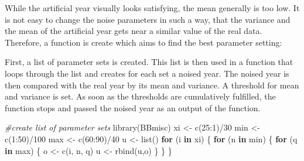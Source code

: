 \documentclass[
]{article}
\newenvironment{Shaded}{\begin{snugshade}}{\end{snugshade}}
\newcommand{\CommentTok}[1]{\textcolor[rgb]{0.56,0.35,0.01}{\textit{#1}}}
\newcommand{\ControlFlowTok}[1]{\textcolor[rgb]{0.13,0.29,0.53}{\textbf{#1}}}
\newcommand{\DecValTok}[1]{\textcolor[rgb]{0.00,0.00,0.81}{#1}}
\newcommand{\FunctionTok}[1]{\textcolor[rgb]{0.00,0.00,0.00}{#1}}
\newcommand{\NormalTok}[1]{#1}
\newcommand{\OtherTok}[1]{\textcolor[rgb]{0.56,0.35,0.01}{#1}}
\newcommand{\SpecialCharTok}[1]{\textcolor[rgb]{0.00,0.00,0.00}{#1}}
\begin{document}
While the artificial year visually looks satisfying, the mean generally
is too low. It is not easy to change the noise parameters in such a way,
that the variance and the mean of the artificial year gets near a
similar value of the real data. Therefore, a function is create which
aims to find the best parameter setting:

First, a list of parameter sets is created. This list is then used in a
function that loops through the list and creates for each set a noised
year. The noised year is then compared with the real year by its mean
and variance. A threshold for mean and variance is set. As soon as the
thresholds are cumulatively fulfilled, the function stops and passed the
noised year as an output of the function.

\begin{Shaded}
\begin{Highlighting}[]
\CommentTok{\#create list of parameter sets}
\FunctionTok{library}\NormalTok{(BBmisc)}
\NormalTok{xi }\OtherTok{\textless{}{-}} \FunctionTok{c}\NormalTok{(}\DecValTok{25}\SpecialCharTok{:}\DecValTok{1}\NormalTok{)}\SpecialCharTok{/}\DecValTok{30}
\NormalTok{min }\OtherTok{\textless{}{-}} \FunctionTok{c}\NormalTok{(}\DecValTok{1}\SpecialCharTok{:}\DecValTok{50}\NormalTok{)}\SpecialCharTok{/}\DecValTok{100}
\NormalTok{max }\OtherTok{\textless{}{-}} \FunctionTok{c}\NormalTok{(}\DecValTok{60}\SpecialCharTok{:}\DecValTok{90}\NormalTok{)}\SpecialCharTok{/}\DecValTok{40}
\NormalTok{u }\OtherTok{\textless{}{-}} \FunctionTok{list}\NormalTok{()}
  \ControlFlowTok{for}\NormalTok{ (i }\ControlFlowTok{in}\NormalTok{ xi) \{}
    \ControlFlowTok{for}\NormalTok{ (n }\ControlFlowTok{in}\NormalTok{ min) \{}
      \ControlFlowTok{for}\NormalTok{ (q }\ControlFlowTok{in}\NormalTok{ max) \{}
\NormalTok{        o }\OtherTok{\textless{}{-}} \FunctionTok{c}\NormalTok{(i, n, q)}
\NormalTok{        u }\OtherTok{\textless{}{-}} \FunctionTok{rbind}\NormalTok{(u,o)}
\NormalTok{      \}}
\NormalTok{    \}}
\NormalTok{  \}}
\end{Highlighting}
\end{Shaded}
\end{document}
